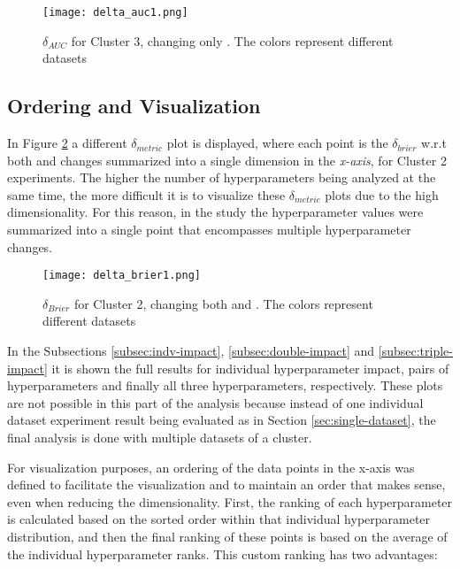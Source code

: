\begin{figure}[H]
    \centering
    \texttt{[image: delta\_auc1.png]}
    \caption{$\delta_{AUC}$ for Cluster 3, changing only . The colors represent different datasets}
    \label{fig:delta-auc1}
\end{figure}

\subsection{Ordering and Visualization}
\label{subsec:ordering}

In Figure \ref{fig:delta-brier1} a different $\delta_{metric}$ plot is displayed, where each point is the $\delta_{brier}$ w.r.t both  and  changes summarized into a single dimension in the \textit{x-axis}, for Cluster 2 experiments. The higher the number of hyperparameters being analyzed at the same time, the more difficult it is to visualize these $\delta_{metric}$ plots due to the high dimensionality. For this reason, in the study the hyperparameter values were summarized into a single point that encompasses multiple hyperparameter changes.

\begin{figure}[!h]
    \centering
    \texttt{[image: delta\_brier1.png]}
    \caption{$\delta_{Brier}$ for Cluster 2, changing both  and . The colors represent different datasets}
    \label{fig:delta-brier1}
\end{figure}


In the Subsections \ref{subsec:indv-impact}, \ref{subsec:double-impact} and \ref{subsec:triple-impact} it is shown the full results for individual hyperparameter impact, pairs of hyperparameters and finally all three hyperparameters, respectively. These plots are not possible in this part of the analysis because instead of one individual dataset experiment result being evaluated as in Section \ref{sec:single-dataset}, the final analysis is done with multiple datasets of a cluster.

For visualization purposes, an ordering of the data points in the x-axis was defined to facilitate the visualization and to maintain an order that makes sense, even when reducing the dimensionality. First, the ranking of each hyperparameter is calculated based on the sorted order within that individual hyperparameter distribution, and then the final ranking of these points is based on the average of the individual hyperparameter ranks. This custom ranking has two advantages:

